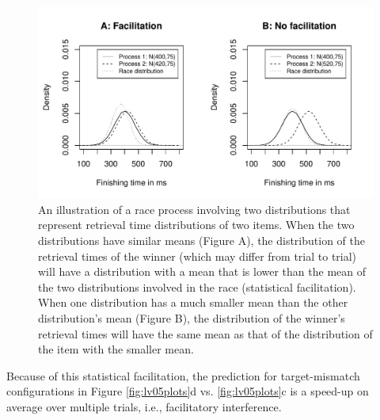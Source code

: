 \documentclass{cambridge7A}\usepackage[]{graphicx}\usepackage[]{color}
\begin{document}
\begin{figure}[!htbp]
\centering
\includegraphics[width=.9\textwidth]{figures/fig-raceproc1}
\caption{An illustration of a race process involving two distributions that represent retrieval time distributions of two items. When the two distributions have similar means (Figure A), the distribution of the retrieval times of the winner (which may differ from trial to trial) will have a distribution with a mean that is lower than the mean of the two distributions involved in the race (statistical facilitation). When one distribution has a much smaller mean than the other distribution's mean (Figure B), the distribution of the winner's retrieval times will have the same mean as that of the distribution of the item with the smaller mean.}\label{fig:raceproc}
\end{figure}

Because of this statistical facilitation, the prediction for target-mismatch configurations in Figure \ref{fig:lv05plots}d vs. \ref{fig:lv05plots}c is a speed-up on average over multiple trials, i.e.,  facilitatory interference.
\end{document}
